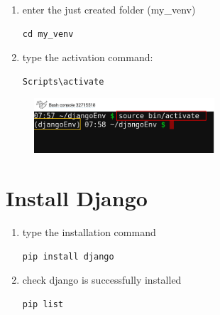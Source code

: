 \documentclass[12pt]{article}
\begin{document}
	\begin{enumerate}
		\item enter the just created folder (my\_venv)

			\begin{lstlisting}[caption=\phantom{},style=conlst,label={lst:create_venv}]
cd my_venv
			\end{lstlisting}

		\item type the activation command:

			\begin{lstlisting}[caption=\phantom{},style=conlst,label={lst:create_venv}]
Scripts\activate
			\end{lstlisting}

	\end{enumerate}

	\begin{figure}[H]
		\centering
		\includegraphics[width =0.6\textwidth ,keepaspectratio]{imgs/activate_venv.png}
		\caption{}
	\end{figure}

\section{Install Django}

	\begin{enumerate}
		\item type the installation command

			\begin{lstlisting}[caption=\phantom{},style=conlst,label={lst:create_venv}]
pip install django
			\end{lstlisting}

		\item check django is successfully installed

			\begin{lstlisting}[caption=\phantom{},style=conlst,label={lst:create_venv}]
pip list
			\end{lstlisting}

	\end{enumerate}
\end{document}
